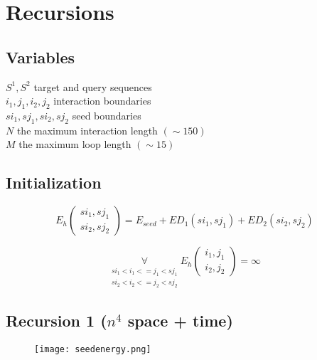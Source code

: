 \section{Recursions}

\subsection{Variables}

$S^1, S^2$ target and query sequences\\
$i_1, j_1, i_2, j_2$ interaction boundaries\\
$si_1, sj_1, si_2, sj_2$ seed boundaries\\
$N$ the maximum interaction length $(\sim 150)$\\
$M$ the maximum loop length $(\sim 15)$

\subsection{Initialization}

\begin{equation*}
E_h(\substack{si_1,sj_1\\si_2,sj_2}) = E_{seed} + ED_{1}(si_{1}, sj_{1}) + ED_{2}(si_{2},sj_{2})
\end{equation*}

\begin{equation*}
\underset{{\substack{si_1 < i_{1} <= j_{1} < sj_{1}\\si_2 < i_{2} <= j_{2} < sj_{2}}}}{\forall} E_h(\substack{i_1,j_1\\i_2,j_2}) = \infty
\end{equation*}

\subsection{Recursion 1 ($n^{4}$ space + time)}

\begin{figure}[H]
	\centering
	\texttt{[image: seedenergy.png]}
\end{figure}

